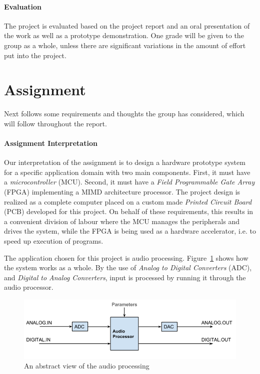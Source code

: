 \paragraph{Evaluation}
The project is evaluated based on the project report and an oral presentation of
the work as well as a prototype demonstration. One grade will be given to the
group as a whole, unless there are significant variations in the amount of
effort put into the project.

\section{Assignment}

Next follows some requirements and thoughts the group has considered, which will follow throughout the report.


\paragraph{Assignment Interpretation}\label{intro:our-assignment-interpretation}
Our interpretation of the assignment is to design a hardware prototype system
for a specific application domain with two main components. First, it must have
a \textit{microcontroller} (MCU). Second, it must have a \textit{Field
Programmable Gate Array} (FPGA) implementing a MIMD architecture processor. The
project design is realized as a complete computer placed on a custom made
\textit{Printed Circuit Board} (PCB) developed for this project. On behalf of
these requirements, this results in a convenient division of labour where the
MCU manages the peripherals and drives the system, while the FPGA is being used
as a hardware accelerator, i.e. to speed up execution of programs.

The application chosen for this project is audio processing.
Figure~\ref{fig:audio_path_overview} shows how the system works as a whole. By
the use of \textit{Analog to Digital Converters} (ADC), and \textit{Digital to
Analog Converters}, input is processed by running it through the audio
processor.

\begin{figure}[H]
    \centering
    \includegraphics[scale=0.4]{figures/intro/intro_audio_analog_digital.png}
    \caption{An abstract view of the audio processing}
    \label{fig:audio_path_overview}
\end{figure}

